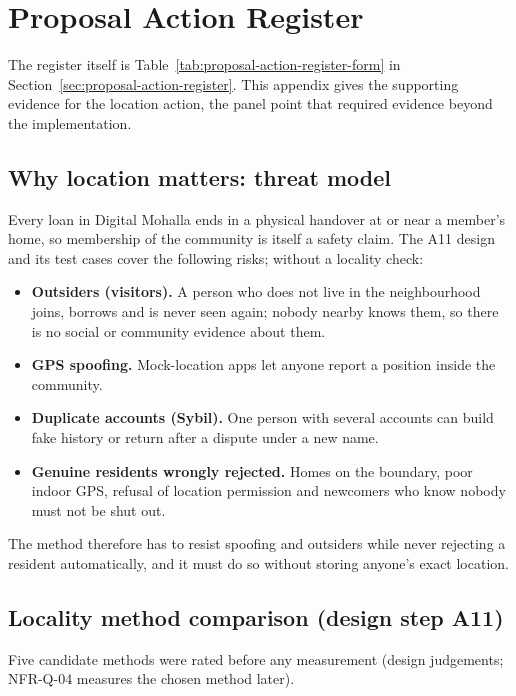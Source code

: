 \chapter{Proposal Action Register}\label{app:proposal-action-register}
The register itself is Table~\ref{tab:proposal-action-register-form} in Section~\ref{sec:proposal-action-register}. This appendix gives the supporting evidence for the location action, the panel point that required evidence beyond the implementation.

\section{Why location matters: threat model}\label{sec:why-location-matters-threat-model}
Every loan in Digital Mohalla ends in a physical handover at or near a member's home, so membership of the community is itself a safety claim. The A11 design and its test cases cover the following risks; without a locality check:

\begin{itemize}
\item \textbf{Outsiders (visitors).} A person who does not live in the neighbourhood joins, borrows and is never seen again; nobody nearby knows them, so there is no social or community evidence about them.
\item \textbf{GPS spoofing.} Mock-location apps let anyone report a position inside the community.
\item \textbf{Duplicate accounts (Sybil).} One person with several accounts can build fake history or return after a dispute under a new name.
\item \textbf{Genuine residents wrongly rejected.} Homes on the boundary, poor indoor GPS, refusal of location permission and newcomers who know nobody must not be shut out.
\end{itemize}

The method therefore has to resist spoofing and outsiders while never rejecting a resident automatically, and it must do so without storing anyone's exact location.

\section{Locality method comparison (design step A11)}\label{sec:locality-method-comparison-design-step}
Five candidate methods were rated before any measurement (design judgements; NFR-Q-04 measures the chosen method later).

